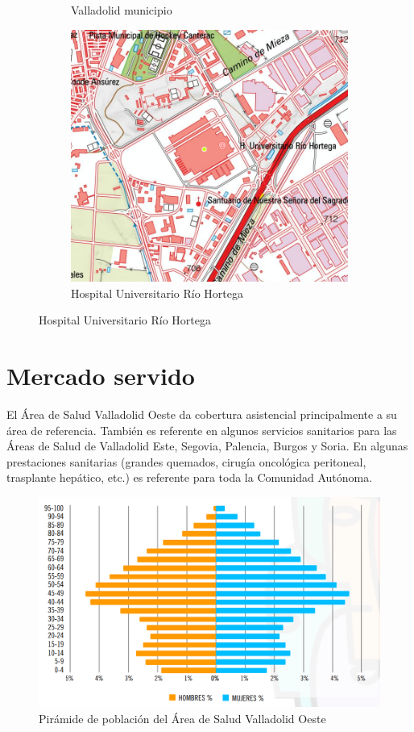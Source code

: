 \begin{figure}[H]
\begin{subfigure}[H]{0.45\textwidth}
        \caption{Valladolid municipio}
    \end{subfigure}
    \hfill
    \begin{subfigure}[H]{0.45\textwidth}
        \centering
        \includegraphics*[width=\textwidth]{img/mapa-hospital.png}
        \caption{Hospital Universitario Río Hortega}
    \end{subfigure}
\end{figure}

\section{Mercado servido}

El Área de Salud Valladolid Oeste da cobertura asistencial principalmente a su área de referencia. También es referente en algunos servicios sanitarios para las Áreas de Salud de Valladolid Este, Segovia, Palencia, Burgos y Soria.
En algunas prestaciones sanitarias (grandes quemados, cirugía oncológica peritoneal, trasplante hepático, etc.) es referente para toda la Comunidad Autónoma.

\begin{figure}[H]
    \centering
    \includegraphics[width=\textwidth]{img/piramide-poblacion.png}
    \caption{Pirámide de población del Área de Salud Valladolid Oeste}
\end{figure}

